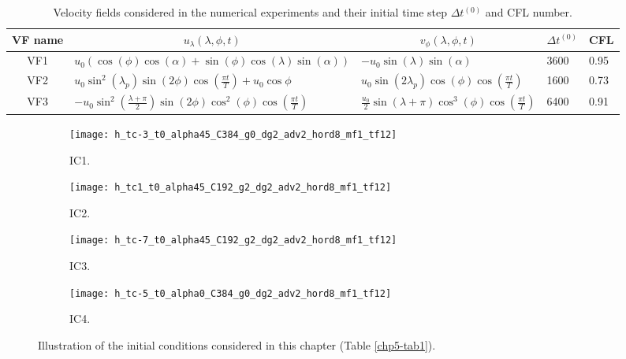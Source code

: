 \begin{table}[!ht]
	\begin{tabular}{|c|l|l|l|l|}
		\hline
		VF name & \multicolumn{1}{c|}{$u_\lambda(\lambda,\phi,t)$} & \multicolumn{1}{c|}{$v_\phi(\lambda,\phi,t)$}
		& \multicolumn{1}{c|}{$\Delta t^{(0)}$}	& \multicolumn{1}{c|}{CFL} \\ \hline
		VF1   & $u_0(\cos(\phi)\cos(\alpha) + \sin(\phi)\cos(\lambda)\sin(\alpha))$ 
		& $-u_0\sin(\lambda)\sin(\alpha)$ & 3600 & 0.95 \\ \hline
		VF2   & $u_0\sin^2(\lambda_p)\sin(2\phi)\cos(\frac{\pi t}{T})+u_0\cos\phi$ 
		& $u_0\sin(2\lambda_p)\cos(\phi)\cos(\frac{\pi t}{T})$& 1600 &0.73 \\ \hline
		VF3   & $-u_0\sin^2(\frac{\lambda+\pi}{2})\sin(2\phi)\cos^2(\phi)\cos(\frac{\pi t}{T})$ 
		& $\frac{u_0}{2}\sin(\lambda+\pi)\cos^3(\phi)\cos(\frac{\pi t}{T})$ & 6400 &0.91 \\ \hline
	\end{tabular}
	\caption{Velocity fields considered in the numerical experiments and their initial time step $\Delta t^{(0)}$ and CFL number.}
	\label{chp5-vf}
\end{table}

\begin{figure}[!htb]
	\centering
	\begin{subfigure}{0.45\textwidth}
		\centering
		\texttt{[image: h\_tc-3\_t0\_alpha45\_C384\_g0\_dg2\_adv2\_hord8\_mf1\_tf12]}
		\caption{IC1. \label{chp5-ic1}}
	\end{subfigure}
	\begin{subfigure}{0.45\textwidth}
		\centering
		\texttt{[image: h\_tc1\_t0\_alpha45\_C192\_g2\_dg2\_adv2\_hord8\_mf1\_tf12]}
		\caption{IC2. \label{chp5-ic2}}
	\end{subfigure}

	\begin{subfigure}{0.45\textwidth}
	\centering
	\texttt{[image: h\_tc-7\_t0\_alpha45\_C192\_g2\_dg2\_adv2\_hord8\_mf1\_tf12]}
	\caption{IC3. \label{chp5-ic3}}
    \end{subfigure}
    \begin{subfigure}{0.45\textwidth}
	\centering
	\texttt{[image: h\_tc-5\_t0\_alpha0\_C384\_g0\_dg2\_adv2\_hord8\_mf1\_tf12]}
	\caption{IC4. \label{chp5-ic4}}
    \end{subfigure}
	\caption{ Illustration of the initial conditions considered in this chapter (Table \ref{chp5-tab1}).\label{chp5-ic}}
\end{figure}


